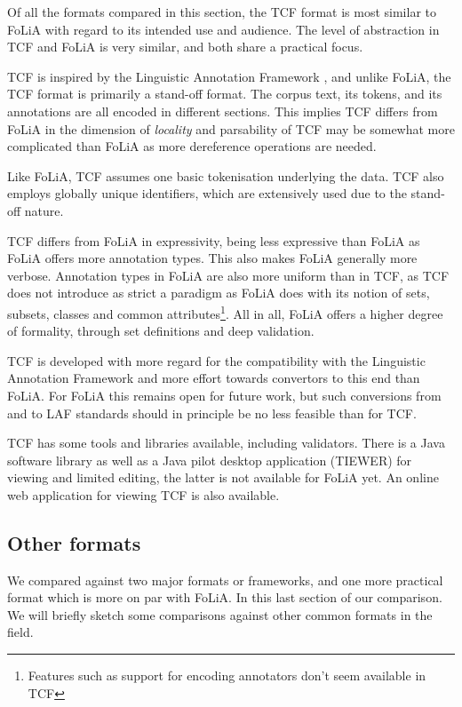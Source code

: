 \documentclass[a4paper,10pt,twoside]{article}
\begin{document}
Of all the formats compared in this section, the TCF format is most similar to
FoLiA with regard to its intended use and audience. The level of abstraction in
TCF and FoLiA is very similar, and both share a practical focus.

TCF is inspired by the Linguistic Annotation Framework \cite{LAF}, and unlike
FoLiA, the TCF format is primarily a stand-off format. The corpus text, its
tokens, and its annotations are all encoded in different sections.  This
implies TCF differs from FoLiA in the dimension of \emph{locality} and
parsability of TCF may be somewhat more complicated than FoLiA as more
dereference operations are needed.

Like FoLiA, TCF assumes one basic tokenisation underlying the data. TCF also
employs globally unique identifiers, which are extensively used due to the
stand-off nature.

TCF differs from FoLiA in expressivity, being less expressive than FoLiA as
FoLiA offers more annotation types. This also makes FoLiA generally more verbose.
Annotation types in FoLiA are also more uniform than in TCF, as TCF does not
introduce as strict a paradigm as FoLiA does with its notion of sets, subsets,
classes and common attributes\footnote{Features such as support for encoding
annotators don't seem available
in TCF}.  All in all, FoLiA offers a higher degree of formality, through set
definitions and deep validation.

TCF is developed with more regard for the compatibility with the Linguistic
Annotation Framework \cite{LAF} and more effort towards convertors to this end
than FoLiA. For FoLiA this remains open for future work, but such conversions
from and to LAF standards should in principle be no less feasible than for TCF.

TCF has some tools and libraries available, including validators. There is a
Java software library as well as a Java pilot desktop application (TIEWER) for
viewing and limited editing, the latter is not available for FoLiA yet. An
online web application for viewing TCF is also available.

\subsection{Other formats}

We compared against two major formats or frameworks, and one more practical format which is
more on par with FoLiA. In this last section of our comparison. We will briefly
sketch some comparisons against other common formats in the field.
\end{document}
